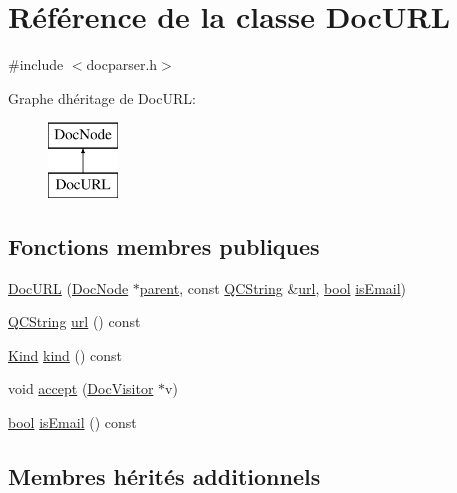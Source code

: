 \hypertarget{class_doc_u_r_l}{}\section{Référence de la classe Doc\+U\+R\+L}
\label{class_doc_u_r_l}


{\ttfamily \#include $<$docparser.\+h$>$}

Graphe d\textquotesingle{}héritage de Doc\+U\+R\+L\+:\begin{figure}[H]
\begin{center}
\leavevmode
\includegraphics[height=2.000000cm]{class_doc_u_r_l}
\end{center}
\end{figure}
\subsection*{Fonctions membres publiques}
\begin{DoxyCompactItemize}
\item 
\hyperlink{class_doc_u_r_l_ac3f8801a6f7507cbed9a9af5bd8d89be}{Doc\+U\+R\+L} (\hyperlink{class_doc_node}{Doc\+Node} $\ast$\hyperlink{class_doc_node_a990d8b983962776a647e6231d38bd329}{parent}, const \hyperlink{class_q_c_string}{Q\+C\+String} \&\hyperlink{class_doc_u_r_l_a339a2025d12d5cc62cc9132fb18619bc}{url}, \hyperlink{qglobal_8h_a1062901a7428fdd9c7f180f5e01ea056}{bool} \hyperlink{class_doc_u_r_l_ac9e105de17ad9048a210dcaafce3c7fb}{is\+Email})
\item 
\hyperlink{class_q_c_string}{Q\+C\+String} \hyperlink{class_doc_u_r_l_a339a2025d12d5cc62cc9132fb18619bc}{url} () const 
\item 
\hyperlink{class_doc_node_aebd16e89ca590d84cbd40543ea5faadb}{Kind} \hyperlink{class_doc_u_r_l_ae6ac3c451918aaeb47fa71dfd33d37f5}{kind} () const 
\item 
void \hyperlink{class_doc_u_r_l_a15d23d59342d72ebc769947aca10e972}{accept} (\hyperlink{class_doc_visitor}{Doc\+Visitor} $\ast$v)
\item 
\hyperlink{qglobal_8h_a1062901a7428fdd9c7f180f5e01ea056}{bool} \hyperlink{class_doc_u_r_l_ac9e105de17ad9048a210dcaafce3c7fb}{is\+Email} () const 
\end{DoxyCompactItemize}
\subsection*{Membres hérités additionnels}


